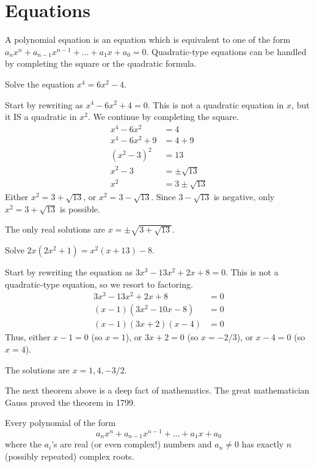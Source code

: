 \documentclass{ximera}
\begin{document}
\section{Equations}

A polynomial equation is an equation which is equivalent to one of the form $a_n x^n + a_{n-1} x^{n-1} + \dots + a_1 x + a_0 = 0$. 
Quadratic-type equations can be handled by completing the square or the quadratic formula.
\begin{example}
	Solve the equation $x^4 = 6x^2 - 4$.
	\begin{explanation}
		Start by rewriting as $x^4 - 6x^2 + 4=0$.  This is not a quadratic equation in $x$, but it IS a quadratic in $x^2$.
		We continue by completing the square.
		\begin{align*}
			x^4 - 6x^2 &= 4 \\
			x^4 - 6x^2 + 9 &= 4 + 9\\
			(x^2 - 3)^2 &= 13\\
			x^2 - 3 &= \pm \sqrt{13}\\
			x^2 &= 3 \pm \sqrt{13}
		\end{align*}
		Either $x^2 = 3 + \sqrt{13}$, or $x^2 = 3 - \sqrt{13}$.  Since $3 - \sqrt{13}$ is negative, only $x^2 = 3 + \sqrt{13}$ is possible.
		
		The only real solutions are $x = \pm \sqrt{3 + \sqrt{13}}$.
	\end{explanation}
\end{example}

\begin{example}
	Solve  $2x(2x^2 + 1) = x^2(x +13) - 8$.
	\begin{explanation}
		Start by rewriting the equation as $3x^3-13x^2+2x+8 = 0$.  This is not a quadratic-type equation, so we resort to factoring.
		\begin{align*}
			3x^3-13x^2+2x+8 &= 0\\
			(x-1)(3x^2-10x-8) &= 0\\
			(x-1)(3x+2)(x-4) &= 0
		\end{align*}
		Thus, either $x -1 = 0$ (so $x = 1$), or $3x+2=0$ (so $x = -2/3$), or $x-4 = 0$ (so $x=4$).
		
		The solutions are $x = 1, 4, -3/2$.
	\end{explanation}
\end{example}


The next theorem above is a deep fact of mathematics. The great mathematician Gauss proved the theorem in 1799. 
\begin{theorem}
  Every polynomial of the form
  \[
  a_n x^n + a_{n-1} x^{n-1} + \dots + a_1 x + a_0
  \]
  where the $a_i$'s are real (or even complex!) numbers and $a_n \ne 0$ has exactly
  $n$ (possibly repeated) complex roots.
\end{theorem}
\end{document}
